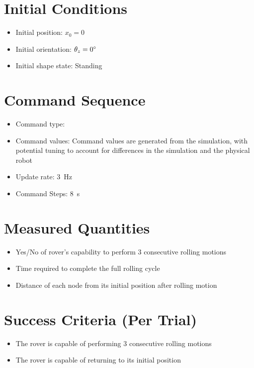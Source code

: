 \documentclass[11pt]{article}
\begin{document}
\section*{Initial Conditions}
\begin{itemize}[noitemsep]
    \item Initial position: $x_0 = 0$
    \item Initial orientation: $\theta_z = 0 {\degree}$
    \item Initial shape state: Standing
\end{itemize}

\section*{Command Sequence}
\begin{itemize}[noitemsep]
    \item Command type: \underline{\hspace{5 cm}} 
    \item Command values: \underline{\hspace{5 cm}} Command values are generated from the simulation, with potential tuning to account for differences in the simulation and the physical robot
    \item Update rate: 3~Hz
    \item Command Steps: 8~s
\end{itemize}

\section*{Measured Quantities}
\begin{itemize}[noitemsep]
    \item Yes/No of rover's capability to perform 3 consecutive rolling motions
    \item Time required to complete the full rolling cycle
    \item Distance of each node from its initial position after rolling motion
\end{itemize}

\section*{Success Criteria (Per Trial)}
\begin{itemize}[noitemsep]
    \item The rover is capable of performing 3 consecutive rolling motions
    \item The rover is capable of returning to its initial position
\end{itemize}
\end{document}
